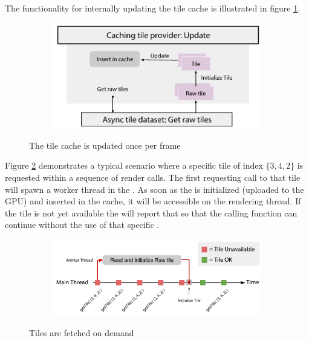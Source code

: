 The functionality for internally updating the tile cache is illustrated in figure \ref{fig:cachingtileprovider_update}.

\begin{figure}[htbp]
    \centering
    \begin{subfigure}[bt]{0.6\textwidth}
        \includegraphics[width=\textwidth]{figures/implementation/tileprovider/cachingtileprovider_update.pdf}
    \end{subfigure}
    \caption{The tile cache is updated once per frame}
    \label{fig:cachingtileprovider_update}
\end{figure}

Figure \ref{fig:cachingtileprovider_tilerequest} demonstrates a typical scenario where a specific tile of index $\{3, 4, 2\}$ is requested within a sequence of render calls. The first requesting call to that tile will spawn a worker thread in the . As soon as the  is initialized (uploaded to the GPU) and inserted in the cache, it will be accessible on the rendering thread. If the tile is not yet available the  will report that so that the calling function can continue without the use of that specific .

\begin{figure}[htbp]
    \centering
    \begin{subfigure}[bt]{0.8\textwidth}
        \includegraphics[width=\textwidth]{figures/implementation/tileprovider/cachingtileprovider_tilerequest.pdf}
    \end{subfigure}
    \caption{Tiles are fetched on demand}
    \label{fig:cachingtileprovider_tilerequest}
\end{figure}

